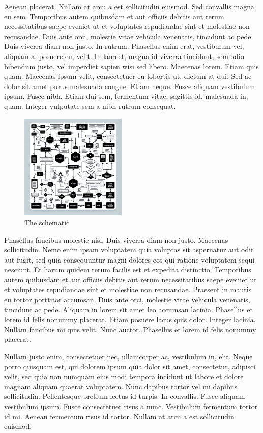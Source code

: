 Aenean placerat. Nullam at arcu a est sollicitudin euismod. Sed convallis magna eu sem. Temporibus autem quibusdam et aut officiis debitis aut rerum necessitatibus saepe eveniet ut et voluptates repudiandae sint et molestiae non recusandae. Duis ante orci, molestie vitae vehicula venenatis, tincidunt ac pede. Duis viverra diam non justo. In rutrum. Phasellus enim erat, vestibulum vel, aliquam a, posuere eu, velit. In laoreet, magna id viverra tincidunt, sem odio bibendum justo, vel imperdiet sapien wisi sed libero. Maecenas lorem. Etiam quis quam. Maecenas ipsum velit, consectetuer eu lobortis ut, dictum at dui. Sed ac dolor sit amet purus malesuada congue. Etiam neque. Fusce aliquam vestibulum ipsum. Fusce nibh. Etiam dui sem, fermentum vitae, sagittis id, malesuada in, quam. Integer vulputate sem a nibh rutrum consequat.

\begin{figure}[h]
    \centering
    \includegraphics[width=0.45\textwidth]{images/schema.jpg}
    \caption{The schematic}
    \label{fig:schema}
\end{figure}

Phasellus faucibus molestie nisl. Duis viverra diam non justo. Maecenas sollicitudin. Nemo enim ipsam voluptatem quia voluptas sit aspernatur aut odit aut fugit, sed quia consequuntur magni dolores eos qui ratione voluptatem sequi nesciunt. Et harum quidem rerum facilis est et expedita distinctio. Temporibus autem quibusdam et aut officiis debitis aut rerum necessitatibus saepe eveniet ut et voluptates repudiandae sint et molestiae non recusandae. Praesent in mauris eu tortor porttitor accumsan. Duis ante orci, molestie vitae vehicula venenatis, tincidunt ac pede. Aliquam in lorem sit amet leo accumsan lacinia. Phasellus et lorem id felis nonummy placerat. Etiam posuere lacus quis dolor. Integer lacinia. Nullam faucibus mi quis velit. Nunc auctor. Phasellus et lorem id felis nonummy placerat.

Nullam justo enim, consectetuer nec, ullamcorper ac, vestibulum in, elit. Neque porro quisquam est, qui dolorem ipsum quia dolor sit amet, consectetur, adipisci velit, sed quia non numquam eius modi tempora incidunt ut labore et dolore magnam aliquam quaerat voluptatem. Nunc dapibus tortor vel mi dapibus sollicitudin. Pellentesque pretium lectus id turpis. In convallis. Fusce aliquam vestibulum ipsum. Fusce consectetuer risus a nunc. Vestibulum fermentum tortor id mi. Aenean fermentum risus id tortor. Nullam at arcu a est sollicitudin euismod.

